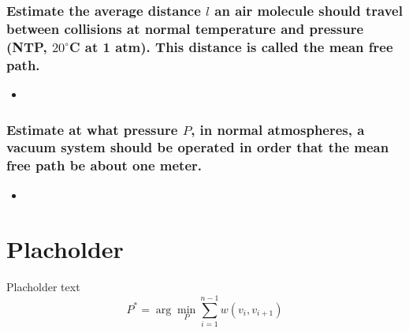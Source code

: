 \documentclass{article}
\begin{document}
\subsubsection{Estimate the average distance $l$ an air molecule should travel between collisions at normal temperature and pressure (NTP, $20^\circ$C at 1 atm). This distance is called the mean free path.}
\begin{itemize}
    \item
\end{itemize}

\subsubsection{Estimate at what pressure $P$, in normal atmospheres, a vacuum system should be operated in order that the mean free path be about one meter.}
\begin{itemize}
    \item
\end{itemize}


\section{Placholder}


Placholder text
$$P^* = \arg\min_{P} \sum_{i=1}^{n-1} w(v_i, v_{i+1})$$
\end{document}
